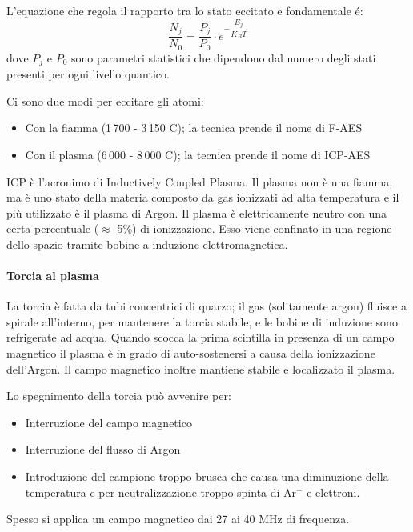
L'equazione che regola il rapporto tra lo stato eccitato e fondamentale é:
\[
\frac{N_j}{N_0} = \frac{P_j}{P_0} \cdot e^{-\dfrac{E_j}{K_B T}}
\]
dove $P_j$ e $P_0$ sono parametri statistici che dipendono dal numero degli stati presenti per ogni livello quantico.

Ci sono due modi per eccitare gli atomi:
\begin{itemize}
\item Con la fiamma (1\,700 - 3\,150 \degree C); la tecnica prende il nome di F-AES
\item Con il plasma (6\,000 - 8\,000 \degree C); la tecnica prende il nome di ICP-AES
\end{itemize}

ICP è l'acronimo di Inductively Coupled Plasma.
Il plasma non è una fiamma, ma è uno stato della materia composto da gas ionizzati ad alta temperatura e il più utilizzato è il plasma di Argon.
Il plasma è elettricamente neutro con una certa percentuale ($\approx$ 5\%) di ionizzazione.
Esso viene confinato in una regione dello spazio tramite bobine a induzione elettromagnetica.

\paragraph{Torcia al plasma}
La torcia è fatta da tubi concentrici di quarzo; il gas (solitamente argon) fluisce a spirale all'interno, per mantenere la torcia stabile, e le bobine di induzione sono refrigerate ad acqua.
Quando scocca la prima scintilla in presenza di un campo magnetico il plasma è in grado di auto-sostenersi a causa della ionizzazione dell'Argon.
Il campo magnetico inoltre mantiene stabile e localizzato il plasma.


Lo spegnimento della torcia può avvenire per:
\begin{itemize}
\item Interruzione del campo magnetico
\item Interruzione del flusso di Argon
\item Introduzione del campione troppo brusca che causa una diminuzione della temperatura e per neutralizzazione troppo spinta di Ar$^+$ e elettroni.
\end{itemize}
Spesso si applica un campo magnetico dai 27 ai 40 MHz di frequenza.

